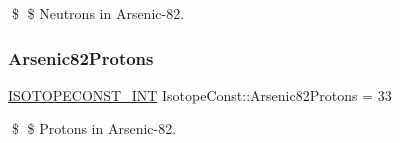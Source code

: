 \$ \$ Neutrons in Arsenic-\/82. \mbox{\label{group___isotope_const-_arsenic-_as82_ga7d75f073167c2ce38739d9278980bc24}} 
\subsubsection{\texorpdfstring{Arsenic82\+Protons}{Arsenic82Protons}}
{\footnotesize\ttfamily \mbox{\hyperlink{group___isotope_const-_macros_ga5f18360b3e99483a35c32d789e62621c}{I\+S\+O\+T\+O\+P\+E\+C\+O\+N\+S\+T\+\_\+\+I\+NT}} Isotope\+Const\+::\+Arsenic82\+Protons = 33}

\$ \$ Protons in Arsenic-\/82. 